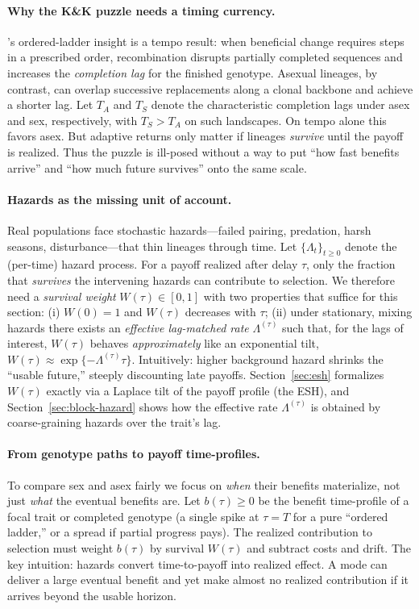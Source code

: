 \documentclass[11pt]{article}
\theoremstyle{upright}
\begin{document}
\paragraph{Why the K\&K puzzle needs a timing currency.}
\citet{Kondrashov2001}'s ordered-ladder insight is a tempo result: when beneficial change requires steps in a prescribed order, recombination disrupts partially completed sequences and increases the \emph{completion lag} for the finished genotype. Asexual lineages, by contrast, can overlap successive replacements along a clonal backbone and achieve a shorter lag. Let $T_A$ and $T_S$ denote the characteristic completion lags under asex and sex, respectively, with $T_S>T_A$ on such landscapes. On tempo alone this favors asex. But adaptive returns only matter if lineages \emph{survive} until the payoff is realized. Thus the puzzle is ill-posed without a way to put “how fast benefits arrive” and “how much future survives” onto the same scale.

\paragraph{Hazards as the missing unit of account.}
Real populations face stochastic hazards—failed pairing, predation, harsh seasons, disturbance—that thin lineages through time. Let $\{\Lambda_t\}_{t\ge 0}$ denote the (per-time) hazard process. For a payoff realized after delay $\tau$, only the fraction that \emph{survives} the intervening hazards can contribute to selection. We therefore need a \emph{survival weight} $W(\tau)\in[0,1]$ with two properties that suffice for this section: (i) $W(0)=1$ and $W(\tau)$ decreases with $\tau$; (ii) under stationary, mixing hazards there exists an \emph{effective lag-matched rate} $\Lambda^{(\tau)}$ such that, for the lags of interest, $W(\tau)$ behaves \emph{approximately} like an exponential tilt, $W(\tau)\approx \exp\!\{-\Lambda^{(\tau)}\tau\}$. Intuitively: higher background hazard shrinks the “usable future,” steeply discounting late payoffs. Section~\ref{sec:esh} formalizes $W(\tau)$ exactly via a Laplace tilt of the payoff profile (the ESH), and Section~\ref{sec:block-hazard} shows how the effective rate $\Lambda^{(\tau)}$ is obtained by coarse-graining hazards over the trait’s lag.

\paragraph{From genotype paths to payoff time-profiles.}
To compare sex and asex fairly we focus on \emph{when} their benefits materialize, not just \emph{what} the eventual benefits are. Let $b(\tau)\ge0$ be the benefit time-profile of a focal trait or completed genotype (a single spike at $\tau=T$ for a pure “ordered ladder,” or a spread if partial progress pays). The realized contribution to selection must weight $b(\tau)$ by survival $W(\tau)$ and subtract costs and drift. The key intuition: hazards convert time-to-payoff into realized effect. A mode can deliver a large eventual benefit and yet make almost no realized contribution if it arrives beyond the usable horizon.
\end{document}
